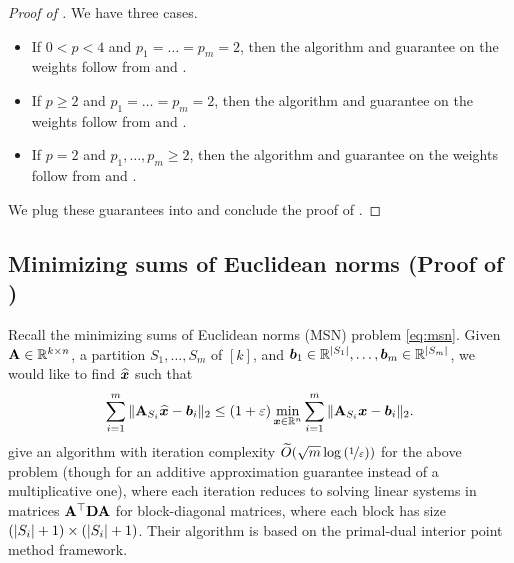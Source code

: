 \documentclass[11pt]{article}
\numberwithin{equation}{section}
\begin{document}
\begin{proof}[Proof of ]
We have three cases.
\begin{itemize}
    \item If $0 < p < 4$ and $p_1=\dots=p_m=2$, then the algorithm and guarantee on the weights follow from  and .
    \item If $p \ge 2$ and $p_1=\dots=p_m=2$, then the algorithm and guarantee on the weights follow from  and .
    \item If $p = 2$ and $p_1,\dots,p_m\ge 2$, then the algorithm and guarantee on the weights follow from  and .
\end{itemize}
We plug these guarantees into  and conclude the proof of .
\end{proof}

\subsection{Minimizing sums of Euclidean norms (Proof of \texorpdfstring{}{Theorem 3})}
\label{sec:applications_msn}

Recall the minimizing sums of Euclidean norms (MSN) problem \eqref{eq:msn}.
Given \(\mathbf{A} \in \mathbb{R}^{k \times n}\), a partition \(S_1, \ldots, S_m\) of \([k]\), and \(\bm{b}_1 \in \mathbb{R}^{|S_1|}, \ldots, \bm{b}_m \in \mathbb{R}^{|S_m|}\), we would like to find $\widehat{\bm{x}}$ such that
\[\sum_{i=1}^m \|\mathbf{A}_{S_i} \widehat{\bm{x}} - \bm{b}_i\|_2\le (1+\varepsilon)\min_{\bm{x} \in \mathbb{R}^n} \sum_{i=1}^m \|\mathbf{A}_{S_i} \bm{x} - \bm{b}_i\|_2.\]
\citet{xy97} give an algorithm with iteration complexity $\widetilde{O}(\sqrt{m}\log\left(\nicefrac{1}{\varepsilon}\right))$ for the above problem (though for an additive approximation guarantee instead of a multiplicative one), where each iteration reduces to solving linear systems in matrices $\mathbf{A}^{\top}\mathbf{D}\mathbf{A}$ for block-diagonal matrices, where each block has size $(\left\lvert S_i \right\rvert+1) \times (\left\lvert S_i \right\rvert+1)$. Their algorithm is based on the primal-dual interior point method framework.
\end{document}

